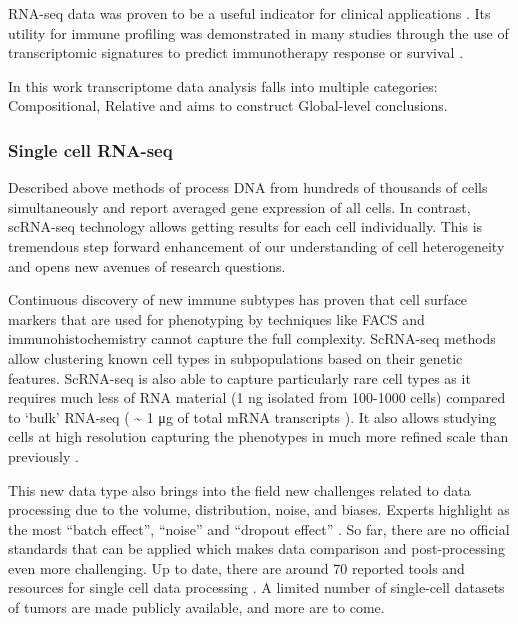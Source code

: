 \documentclass[12pt,]{book}
\theoremstyle{definition}
\theoremstyle{definition}
\theoremstyle{definition}
\theoremstyle{remark}
\begin{document}
RNA-seq data was proven to be a useful indicator for clinical
applications \citep{Mody2015, Oberg2016, Robinson2017}. Its utility for
immune profiling was demonstrated in many studies through the use of
transcriptomic signatures to predict immunotherapy response or survival
\citep{Chen2016}.

In this work transcriptome data analysis falls into multiple categories:
Compositional, Relative and aims to construct Global-level conclusions.

\hypertarget{single-cell-rna-seq}{%
\subsubsection{Single cell RNA-seq}\label{single-cell-rna-seq}}

Described above methods of process DNA from hundreds of thousands of
cells simultaneously and report averaged gene expression of all cells.
In contrast, scRNA-seq technology allows getting results for each cell
individually. This is tremendous step forward enhancement of our
understanding of cell heterogeneity and opens new avenues of research
questions.

Continuous discovery of new immune subtypes has proven that cell surface
markers that are used for phenotyping by techniques like FACS and
immunohistochemistry cannot capture the full complexity. ScRNA-seq
methods allow clustering known cell types in subpopulations based on
their genetic features. ScRNA-seq is also able to capture particularly
rare cell types as it requires much less of RNA material (1 ng isolated
from 100-1000 cells) compared to `bulk' RNA-seq ( \textasciitilde{} 1 μg
of total mRNA transcripts ). It also allows studying cells at high
resolution capturing the phenotypes in much more refined scale than
previously \citep{Papalexi2017}.

This new data type also brings into the field new challenges related to
data processing due to the volume, distribution, noise, and biases.
Experts highlight as the most ``batch effect'', ``noise'' and ``dropout
effect'' \citep{Perkel2017}. So far, there are no official standards
that can be applied which makes data comparison and post-processing even
more challenging. Up to date, there are around 70 reported tools and
resources for single cell data processing \citep{Davis2016}. A limited
number of single-cell datasets of tumors are made publicly available,
and more are to come.
\end{document}

